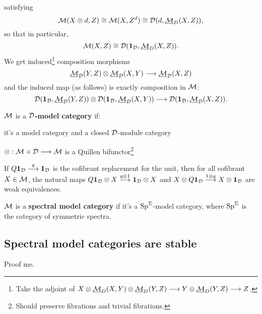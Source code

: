 \documentclass[11pt]{article}
\begin{document}
\begin{MichaelStableModelCats}
\begin{itemise}
satisfying
\[\mathcal{M}(X\otimes d,Z)\cong \mathcal{M}(X,Z^d)\cong\mathcal{D}(d,\underline{\mathcal{M}}_D(X,Z)),\]
so that in particular,
\[\mathcal{M}(X,Z)\cong \mathcal{D}(\textbf{1}_{\mathcal{D}},\underline{\mathcal{M}}_D(X,Z)).\]
We get induced\footnote{Take the adjoint of 
$X\otimes \underline{\mathcal{M}}_D(X,Y)\otimes\underline{\mathcal{M}}_D(Y,Z)\longrightarrow Y\otimes\underline{\mathcal{M}}_D(Y,Z)\longrightarrow Z$.} composition morphisms
\[\underline{\mathcal{M}}_{\mathcal{D}}(Y,Z)\otimes\underline{\mathcal{M}}_{\mathcal{D}}(X,Y)\longrightarrow
\underline{\mathcal{M}}_{\mathcal{D}}(X,Z)\]
and the induced map (as follows) is exactly composition in $\mathcal{M}$:
\[\mathcal{D}(\textbf{1}_{\mathcal{D}},\underline{\mathcal{M}}_{\mathcal{D}}(Y,Z))\otimes\mathcal{D}(\textbf{1}_{\mathcal{D}},\underline{\mathcal{M}}_{\mathcal{D}}(X,Y))\longrightarrow
\mathcal{D}(\textbf{1}_{\mathcal{D}},\underline{\mathcal{M}}_{\mathcal{D}}(X,Z)).\]
\item $\mathcal{M}$ is a \textbf{$\mathcal{D}$-model category} if:
\begin{itemise}
\item it's a model category and a closed $\mathcal{D}$-module category
\item $\otimes:\mathcal{M}\times\mathcal{D}\longrightarrow\mathcal{M}$ is a Quillen bifunctor\footnote{Should preserve fibrations and trivial fibrations.}
\item If $Q\textbf{1}_{\mathcal{D}}\overset{q}{\longrightarrow}\textbf{1}_{\mathcal{D}}$ is the cofibrant replacement for the unit, then for all cofibrant $X\in\mathcal{M}$, the natural maps $Q\textbf{1}_{\mathcal{D}}\otimes X\overset{q\otimes1}{\longrightarrow}\textbf{1}_{\mathcal{D}}\otimes X$ and $X\otimes Q\textbf{1}_{\mathcal{D}} \overset{1\otimes q}{\longrightarrow}X\otimes \textbf{1}_{\mathcal{D}}$ are weak equivalences.
\end{itemise}
\item $\mathcal{M}$ is a \textbf{spectral model category} if it's a $\operatorname{Sp}^\Sigma$-model category, where $\operatorname{Sp}^\Sigma$ is the category of symmetric spectra.
\end{itemise}
\subsection{Spectral model categories are stable}
Proof me.

\end{MichaelStableModelCats}
\end{document}
